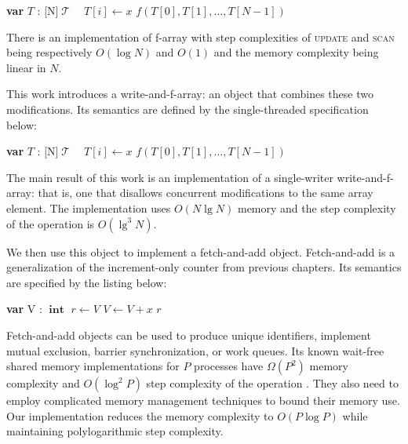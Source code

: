 \documentclass[a4paper,11pt]{article}
\def\T{\ensuremath{\operatorname{\mathcal{T}}}\text{ }}
\def\int{\ensuremath{\operatorname{\textbf{int}}}}
\newcommand{\fn}[1]{\textsc{#1}}
\newcommand{\var}[2]{\textbf{var }#1 : #2}
\newcommand{\arrayspec}[1]{\text{array}[#1]\text{ of }}
\begin{document}
\begin{algorithmic}[1]
	\State\var{$T$}{\arrayspec{N}$\T$}
	\State $T[i] \gets x$
\EndFunction
{}
	\State\Return $f(T[0], T[1], \ldots, T[N-1])$
\EndFunction
\end{algorithmic}

There is an implementation of f-array with step complexities of \fn{update} and \fn{scan} being respectively $O(\log N)$ and $O(1)$ and the memory complexity
being linear in $N$.

This work introduces a write-and-f-array: an object that combines these two modifications. Its semantics are defined by the single-threaded specification below:

\begin{algorithmic}[1]
	\State\var{$T$}{\arrayspec{N}$\T$}
		\State $T[i] \gets x$
		\State\Return $f(T[0], T[1], \ldots, T[N-1])$
	\EndFunction
\end{algorithmic}

The main result of this work is an implementation of a single-writer
write-and-f-array: that is, one that disallows concurrent modifications to the same array element. The implementation
uses $O(N\lg{}N)$ memory and the step complexity of the operation is $O(\lg^3N)$. 

We then use this object to implement a fetch-and-add object. Fetch-and-add is a generalization of the increment-only counter from previous chapters. Its semantics are specified by the listing below:

\begin{algorithmic}[1]
\State\var{V}{\int}
	\State $r \gets V$
	\State $V \gets V + x$
	\State\Return $r$
\EndFunction
\end{algorithmic}


Fetch-and-add objects can be used to produce unique identifiers, implement
mutual exclusion, barrier synchronization\cite{faa-sync}, or work queues\cite{faa-queue}. Its known wait-free shared memory implementations for $P$ processes have $\Omega(P^2)$ memory complexity and $O(\log^2 P)$ step complexity
of the operation \cite{ellen-fai}\cite{closed-object}. They also need to employ complicated memory management techniques to bound their memory use. Our implementation reduces the memory complexity to $O(P\log P)$ while maintaining polylogarithmic step complexity.
\end{document}
